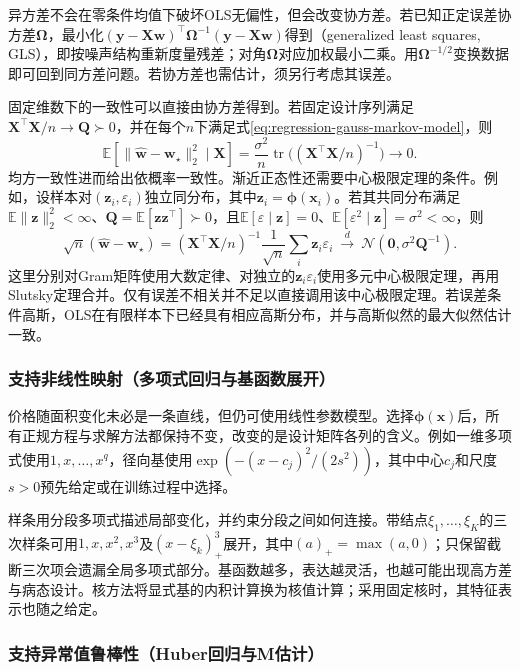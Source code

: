 异方差不会在零条件均值下破坏OLS无偏性，但会改变协方差。若已知正定误差协方差$\bm{\Omega}$，最小化$(\bm{y}-\bm{X}\bm{w})^{\top}\bm{\Omega}^{-1}(\bm{y}-\bm{X}\bm{w})$得到（generalized least squares, GLS），即按噪声结构重新度量残差；对角$\bm{\Omega}$对应加权最小二乘。用$\bm{\Omega}^{-1/2}$变换数据即可回到同方差问题。若协方差也需估计，须另行考虑其误差。

固定维数下的一致性可以直接由协方差得到。若固定设计序列满足$\bm{X}^{\top}\bm{X}/n\to\bm{Q}\succ0$，并在每个$n$下满足式\eqref{eq:regression-gauss-markov-model}，则
\[
  \mathbb{E}[\lVert\widehat{\bm{w}}-\bm{w}_{\star}\rVert_2^2\mid\bm{X}]
  =\frac{\sigma^2}{n}\operatorname{tr}
       \bigl((\bm{X}^{\top}\bm{X}/n)^{-1}\bigr)\longrightarrow0.
\]
均方一致性进而给出依概率一致性。渐近正态性还需要中心极限定理的条件。例如，设样本对$(\bm{z}_i,\varepsilon_i)$独立同分布，其中$\bm{z}_i=\bm{\phi}(\bm{x}_i)$。若其共同分布满足$\mathbb{E}\lVert\bm{z}\rVert_2^2<\infty$、$\bm{Q}=\mathbb{E}[\bm{z}\bm{z}^{\top}]\succ0$，且$\mathbb{E}[\varepsilon\mid\bm{z}]=0$、$\mathbb{E}[\varepsilon^2\mid\bm{z}]=\sigma^2<\infty$，则
\[
  \sqrt n(\widehat{\bm{w}}-\bm{w}_{\star})
  =
  (\bm{X}^{\top}\bm{X}/n)^{-1}
  \frac{1}{\sqrt n}\sum_i\bm{z}_i\varepsilon_i
  \ \xrightarrow{d}\ \mathcal{N}(\bm{0},\sigma^2\bm{Q}^{-1}).
\]
这里分别对Gram矩阵使用大数定律、对独立的$\bm{z}_i\varepsilon_i$使用多元中心极限定理，再用Slutsky定理合并。仅有误差不相关并不足以直接调用该中心极限定理。若误差条件高斯，OLS在有限样本下已经具有相应高斯分布，并与高斯似然的最大似然估计一致。

\subsubsection{支持非线性映射（多项式回归与基函数展开）}
\label{sec:regression-basis}

价格随面积变化未必是一条直线，但仍可使用线性参数模型。选择$\bm{\phi}(\bm{x})$后，所有正规方程与求解方法都保持不变，改变的是设计矩阵各列的含义。例如一维多项式使用$1,x,\ldots,x^q$，径向基使用$\exp(-(x-c_j)^2/(2s^2))$，其中中心$c_j$和尺度$s>0$预先给定或在训练过程中选择。

样条用分段多项式描述局部变化，并约束分段之间如何连接。带结点$\xi_1,\ldots,\xi_K$的三次样条可用$1,x,x^2,x^3$及$(x-\xi_k)_+^3$展开，其中$(a)_+=\max(a,0)$；只保留截断三次项会遗漏全局多项式部分。基函数越多，表达越灵活，也越可能出现高方差与病态设计。核方法将显式基的内积计算换为核值计算；采用固定核时，其特征表示也随之给定。

\subsubsection{支持异常值鲁棒性（Huber回归与M估计）}
\label{sec:regression-huber}

